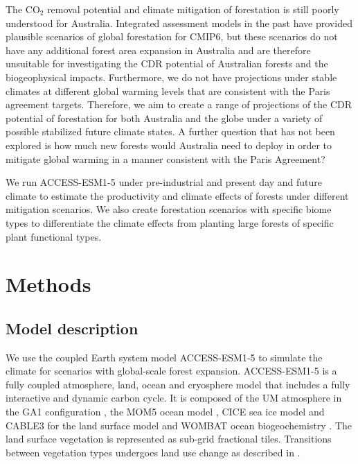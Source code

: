 \documentclass[]{article}
\begin{document}
The CO$_2$ removal potential and climate mitigation of forestation is still poorly understood for Australia.
Integrated assessment models in the past have provided plausible scenarios of global forestation for CMIP6, but these scenarios do not have any additional forest area expansion in Australia \parencite{loughran_limited_2023} and are therefore unsuitable for investigating the CDR potential of Australian forests and the biogeophysical impacts.
Furthermore, we do not have projections under stable climates at different global warming levels that are consistent with the Paris agreement targets.
Therefore, we aim to create a range of projections of the CDR potential of forestation for both Australia and the globe under a variety of possible stabilized future climate states.
A further question that has not been explored is how much new forests would Australia need to deploy in order to mitigate global warming in a manner consistent with the Paris Agreement?

We run ACCESS-ESM1-5 under pre-industrial and present day and future climate to estimate the productivity and climate effects of forests under different mitigation scenarios.
We also create forestation scenarios with specific biome types to differentiate the climate effects from planting large forests of specific plant functional types.

\section{Methods}

\subsection{Model description}

We use the coupled Earth system model ACCESS-ESM1-5 to simulate the climate for scenarios with global-scale forest expansion.
ACCESS-ESM1-5 is a fully coupled atmosphere, land, ocean and cryosphere model that includes a fully interactive and dynamic carbon cycle.
It is composed of the UM atmosphere in the GA1 configuration \parencite{martin_analysis_2010}, the MOM5 ocean model \parencite{griffies_elements_2012}, CICE sea ice model \parencite{hunke_cice_nodate} and CABLE3 for the land surface model and WOMBAT ocean biogeochemistry \parencite{law_carbon_2017}.
The land surface vegetation is represented as sub-grid fractional tiles.
Transitions between vegetation types undergoes land use change as described in \cite{ziehn_australian_2020}.
\end{document}
